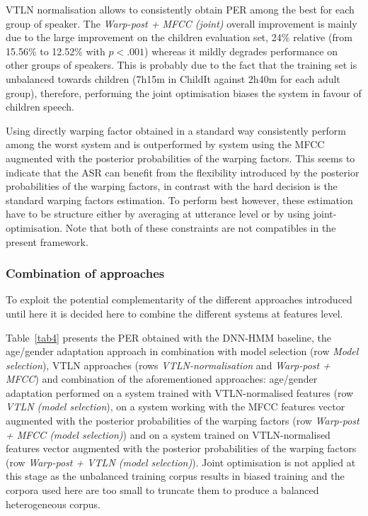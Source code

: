 \documentclass{nle}
\begin{document}
VTLN normalisation allows to consistently obtain PER among the best for each group of speaker. The {\em Warp-post + MFCC (joint)} overall improvement is mainly due to the large improvement on the children evaluation set, 24\% relative (from 15.56\% to 12.52\% with $p  <.001$) whereas it mildly degrades performance on other groups of speakers. This is probably due to the fact that the training set is unbalanced towards children (7h15m in ChildIt against 2h40m for each adult group), therefore, performing the joint optimisation biases the system in favour of children speech.

Using directly warping factor obtained in a standard way consistently perform among the worst system and is outperformed by system using the MFCC augmented with the posterior probabilities of the warping factors. This seems to indicate that the ASR can benefit from the flexibility introduced by the posterior probabilities of the warping factors, in contrast with the hard decision is the standard warping factors estimation. To perform best however, these estimation have to be structure either by averaging at utterance level or by using joint-optimisation. Note that both of these constraints are not compatibles in the present framework.


\subsubsection{Combination of approaches}

To exploit the potential complementarity of  the different approaches introduced  until here  it is  decided here  to combine  the different systems at features level.

Table~\ref{tab4} presents the PER obtained with the DNN-HMM baseline, the age/gender adaptation approach in combination with model selection (row {\em Model selection}), VTLN approaches (rows {\em VTLN-normalisation} and {\em Warp-post + MFCC}) and combination of the aforementioned approaches: age/gender adaptation performed on a system trained with VTLN-normalised features (row {\em VTLN (model selection}), on a system working with the MFCC features vector augmented with the posterior probabilities of the warping factors (row {\em Warp-post + MFCC (model selection)}) and on a system trained on VTLN-normalised features vector augmented with the posterior probabilities of the warping factors (row {\em Warp-post + VTLN (model selection)}). Joint optimisation is not applied at this stage as the unbalanced training corpus results in biased training and the corpora used here are too small to truncate them to produce a balanced heterogeneous corpus. 
\end{document}
